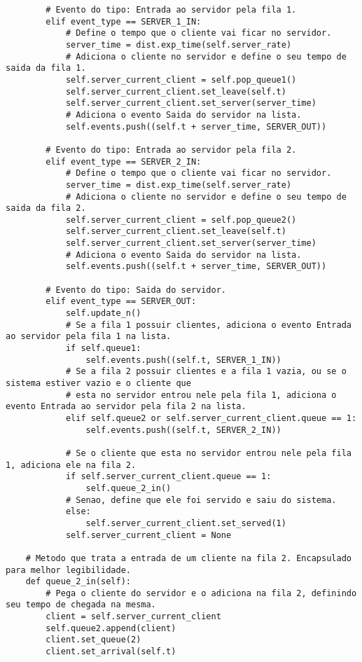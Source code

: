 \begin{lstlisting}
        # Evento do tipo: Entrada ao servidor pela fila 1.
        elif event_type == SERVER_1_IN:
            # Define o tempo que o cliente vai ficar no servidor.
            server_time = dist.exp_time(self.server_rate)
            # Adiciona o cliente no servidor e define o seu tempo de saida da fila 1.
            self.server_current_client = self.pop_queue1()
            self.server_current_client.set_leave(self.t)
            self.server_current_client.set_server(server_time)
            # Adiciona o evento Saida do servidor na lista.
            self.events.push((self.t + server_time, SERVER_OUT))        

        # Evento do tipo: Entrada ao servidor pela fila 2.
        elif event_type == SERVER_2_IN:
            # Define o tempo que o cliente vai ficar no servidor.        
            server_time = dist.exp_time(self.server_rate)
            # Adiciona o cliente no servidor e define o seu tempo de saida da fila 2.
            self.server_current_client = self.pop_queue2()
            self.server_current_client.set_leave(self.t)
            self.server_current_client.set_server(server_time)
            # Adiciona o evento Saida do servidor na lista.
            self.events.push((self.t + server_time, SERVER_OUT))                

        # Evento do tipo: Saida do servidor.
        elif event_type == SERVER_OUT:
            self.update_n()
            # Se a fila 1 possuir clientes, adiciona o evento Entrada ao servidor pela fila 1 na lista.
            if self.queue1:
                self.events.push((self.t, SERVER_1_IN))
            # Se a fila 2 possuir clientes e a fila 1 vazia, ou se o sistema estiver vazio e o cliente que
            # esta no servidor entrou nele pela fila 1, adiciona o evento Entrada ao servidor pela fila 2 na lista.
            elif self.queue2 or self.server_current_client.queue == 1:
                self.events.push((self.t, SERVER_2_IN))
            
            # Se o cliente que esta no servidor entrou nele pela fila 1, adiciona ele na fila 2.
            if self.server_current_client.queue == 1:
                self.queue_2_in()
            # Senao, define que ele foi servido e saiu do sistema.
            else:
                self.server_current_client.set_served(1)
            self.server_current_client = None

    # Metodo que trata a entrada de um cliente na fila 2. Encapsulado para melhor legibilidade.
    def queue_2_in(self):
        # Pega o cliente do servidor e o adiciona na fila 2, definindo seu tempo de chegada na mesma.
        client = self.server_current_client
        self.queue2.append(client)
        client.set_queue(2)
        client.set_arrival(self.t)


\end{lstlisting}
